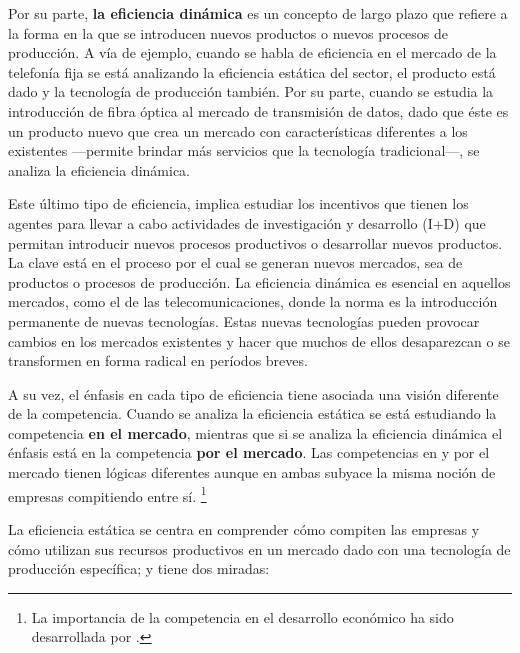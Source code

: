 \documentclass[
  12pt,
  spanish,
]{book}
\begin{document}
Por su parte, \textbf{la eficiencia dinámica} es un concepto de largo
plazo que refiere a la forma en la que se introducen nuevos productos o
nuevos procesos de producción. A vía de ejemplo, cuando se habla de
eficiencia en el mercado de la telefonía fija se está analizando la
eficiencia estática del sector, el producto está dado y la tecnología de
producción también. Por su parte, cuando se estudia la introducción de
fibra óptica al mercado de transmisión de datos, dado que éste es un
producto nuevo que crea un mercado con características diferentes a los
existentes ---permite brindar más servicios que la tecnología
tradicional---, se analiza la eficiencia dinámica.

Este último tipo de eficiencia, implica estudiar los incentivos que
tienen los agentes para llevar a cabo actividades de investigación y
desarrollo (I+D) que permitan introducir nuevos procesos productivos o
desarrollar nuevos productos. La clave está en el proceso por el cual se
generan nuevos mercados, sea de productos o procesos de producción. La
eficiencia dinámica es esencial en aquellos mercados, como el de las
telecomunicaciones, donde la norma es la introducción permanente de
nuevas tecnologías. Estas nuevas tecnologías pueden provocar cambios en
los mercados existentes y hacer que muchos de ellos desaparezcan o se
transformen en forma radical en períodos breves.

A su vez, el énfasis en cada tipo de eficiencia tiene asociada una
visión diferente de la competencia. Cuando se analiza la eficiencia
estática se está estudiando la competencia \textbf{en el mercado},
mientras que si se analiza la eficiencia dinámica el énfasis está en la
competencia \textbf{por el mercado}. Las competencias en y por el
mercado tienen lógicas diferentes aunque en ambas subyace la misma
noción de empresas compitiendo entre sí. \footnote{La importancia de la
  competencia en el desarrollo económico ha sido desarrollada por
  \citet{Aghion2005}.}

La eficiencia estática se centra en comprender cómo compiten las
empresas y cómo utilizan sus recursos productivos en un mercado dado con
una tecnología de producción específica; y tiene dos miradas:
\end{document}
